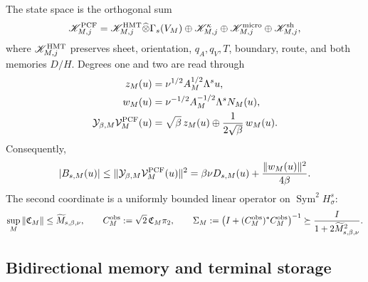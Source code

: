 The state space is the orthogonal sum
\begin{equation}
 \mathscr K_{M,j}^{\rm PCF}
 =\mathscr K_{M,j}^{\rm HMT}\widehat\otimes\Gamma_s(V_M)
 \oplus\mathscr K_{M,j}^{\kappa}
 \oplus\mathscr K_{M,j}^{\rm micro}
 \oplus\mathscr K_{M,j}^{\rm sh},
 \label{eq:ns-import-full-carrier}
\end{equation}
where \(\mathscr K_{M,j}^{\rm HMT}\) preserves sheet, orientation, \(q_A,q_V,T\), boundary, route, and both memories \(D/H\). Degrees one and two are read through
\begin{equation}
 \begin{aligned}
 z_M(u)&=\nu^{1/2}A_M^{1/2}\Lambda^su,\\
 w_M(u)&=\nu^{-1/2}A_M^{-1/2}\Lambda^sN_M(u),\\
 \mathcal Y_{\beta,M}\mathcal V_M^{\rm PCF}(u)
 &=\sqrt\beta\,z_M(u)
   \oplus\frac{1}{2\sqrt\beta}\,w_M(u).
 \end{aligned}
 \label{eq:ns-import-degree-one-two-reader}
\end{equation}
Consequently,
\begin{equation}
 |B_{s,M}(u)|
 \le
 \|\mathcal Y_{\beta,M}\mathcal V_M^{\rm PCF}(u)\|^2
 =\beta\nu D_{s,M}(u)+\frac{\|w_M(u)\|^2}{4\beta}.
 \label{eq:ns-import-young-port}
\end{equation}
The second coordinate is a uniformly bounded linear operator on \(\operatorname{Sym}^2H^s_\sigma\):
\begin{equation}
 \sup_M\|\mathfrak C_M\|
 \le\widetilde M_{s,\beta,\nu},
 \qquad
 C_M^{\rm obs}:=\sqrt2\,\mathfrak C_M\pi_2,
 \qquad
 \Sigma_M:=\bigl(I+(C_M^{\rm obs})^*C_M^{\rm obs}\bigr)^{-1}
 \succeq\frac{I}{1+2\widetilde M_{s,\beta,\nu}^2}.
 \label{eq:ns-import-uniform-graph}
\end{equation}

\subsection{Bidirectional memory and terminal storage}

